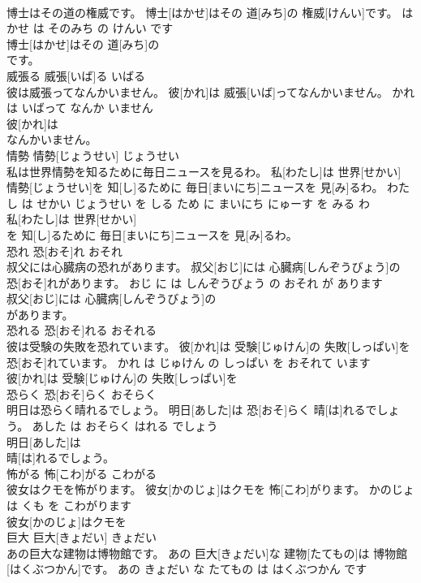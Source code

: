 \documentclass[8pt]{extreport}
\begin{document}
\begin{CJK}{UTF8}{min}
\\	博士はその道の権威です。	博士[はかせ]はその 道[みち]の 権威[けんい]です。	はかせ は そのみち の けんい です	
\\	博士[はかせ]はその 道[みち]の
\\	です。			
\\	威張る	威張[いば]る	いばる	
\\	彼は威張ってなんかいません。	彼[かれ]は 威張[いば]ってなんかいません。	かれ は いばって なんか いません	
\\	彼[かれ]は
\\	なんかいません。			
\\	情勢	情勢[じょうせい]	じょうせい	
\\	私は世界情勢を知るために毎日ニュースを見るわ。	私[わたし]は 世界[せかい] 情勢[じょうせい]を 知[し]るために 毎日[まいにち]ニュースを 見[み]るわ。	わたし は せかい じょうせい を しる ため に まいにち にゅーす を みる わ	
\\	私[わたし]は 世界[せかい]
\\	を 知[し]るために 毎日[まいにち]ニュースを 見[み]るわ。			
\\	恐れ	恐[おそ]れ	おそれ	
\\	叔父には心臓病の恐れがあります。	叔父[おじ]には 心臓病[しんぞうびょう]の 恐[おそ]れがあります。	おじ に は しんぞうびょう の おそれ が あります	
\\	叔父[おじ]には 心臓病[しんぞうびょう]の
\\	があります。			
\\	恐れる	恐[おそ]れる	おそれる	
\\	彼は受験の失敗を恐れています。	彼[かれ]は 受験[じゅけん]の 失敗[しっぱい]を 恐[おそ]れています。	かれ は じゅけん の しっぱい を おそれて います	
\\	彼[かれ]は 受験[じゅけん]の 失敗[しっぱい]を
\\	恐らく	恐[おそ]らく	おそらく	
\\	明日は恐らく晴れるでしょう。	明日[あした]は 恐[おそ]らく 晴[は]れるでしょう。	あした は おそらく はれる でしょう	
\\	明日[あした]は
\\	晴[は]れるでしょう。			
\\	怖がる	怖[こわ]がる	こわがる	
\\	彼女はクモを怖がります。	彼女[かのじょ]はクモを 怖[こわ]がります。	かのじょ は くも を こわがります	
\\	彼女[かのじょ]はクモを
\\	巨大	巨大[きょだい]	きょだい	
\\	あの巨大な建物は博物館です。	あの 巨大[きょだい]な 建物[たてもの]は 博物館[はくぶつかん]です。	あの きょだい な たてもの は はくぶつかん です	

\end{CJK}
\end{document}
